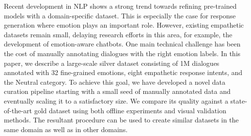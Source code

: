 Recent development in NLP shows a strong trend towards refining pre-trained models with a domain-specific dataset. This is especially the case for response generation where emotion plays an important role. However, existing empathetic datasets remain small, delaying research efforts in this area, for example, the development of emotion-aware chatbots. One main technical challenge has been the cost of manually annotating dialogues with the right emotion labels. In this paper, we describe a large-scale silver dataset consisting of 1M dialogues annotated with 32 fine-grained emotions, eight empathetic response intents, and the Neutral category. To achieve this goal, we have developed a novel data curation pipeline starting with a small seed of manually annotated data and eventually scaling it to a satisfactory size. We compare its quality against a state-of-the-art gold dataset using both offline experiments and visual validation methods. The resultant procedure can be used to create similar datasets in the same domain as well as in other domains.
